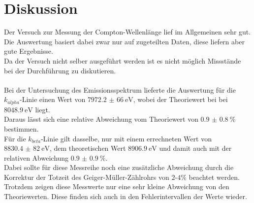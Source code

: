 \newpage
\section{Diskussion}
%
%
%       
%


\noindent
Der Versuch zur Messung der Compton-Wellenlänge lief im Allgemeinen sehr gut. Die Auswertung basiert dabei zwar nur auf zugeteilten Daten, diese liefern aber gute Ergebnisse.\\
Da der Versuch nicht selber ausgeführt werden ist es nicht möglich Missstände bei der Durchführung zu diskutieren.\\\\
\noindent
Bei der Untersuchung des Emissionsspektrum lieferte die Auswertung für die $k_{alpha}$-Linie einen Wert von $\SI{7972.2(660)}{\electronvolt}$, wobei der Theoriewert\cite{theo} bei bei $\SI{8048.9}{\electronvolt}$ liegt.\\
Daraus lässt sich eine relative Abweichung vom Theoriewert von $\SI{0.9(08)}{\percent}$ bestimmen.\\
Für die $k_{beta}$-Linie gilt dasselbe, nur mit einem errechneten Wert von $\SI{8830.4(820)}{\electronvolt}$, dem theoretischen Wert $\SI{8906.9}{\electronvolt}$\cite{theo} und damit auch mit der relativen Abweichung $\SI{0.9(09)}{\percent}$.\\
Dabei sollte für diese Messreihe noch eine zusätzliche Abweichung durch die Korrektur der Totzeit des Geiger-Müller-Zählrohrs von $2$-$4\si{\percent}$ beachtet werden.\\
Trotzdem zeigen diese Messwerte nur eine sehr kleine Abweichung von den Theoriewerten. Diese finden sich auch in den Fehlerintervallen der Werte wieder.\\\\

